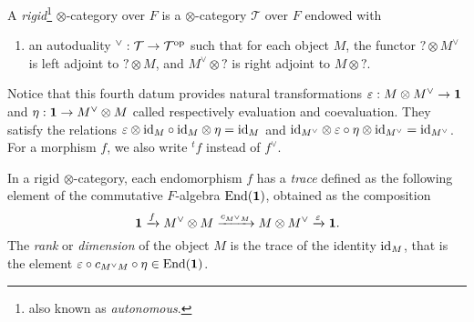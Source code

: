 \documentclass[../main.tex]{subfiles}
\begin{document}
A \emph{rigid}\footnote{also known as \emph{autonomous}.} $\otimes$-category over $F$ is a $\otimes$-category $\mathcal{T}$ over $F$ endowed with
\begin{enumerate}[resume, label=\roman*)]
    \item an autoduality $^{\vee} : \mathcal{T} \to \mathcal{T}^{\mathrm{op}}$ such that for each object $M$, the functor $? \otimes M^{\vee}$ is left adjoint to $? \otimes M$, and $M^{\vee} \otimes ?$ is right adjoint to $M \otimes ?$.
\end{enumerate}

Notice that this fourth datum provides natural transformations $\varepsilon : M \otimes M^{\vee} \to \mathbf{1}$ and $\eta : \mathbf{1} \to M^{\vee} \otimes M$ called respectively evaluation and coevaluation.
They satisfy the relations $\varepsilon \otimes \mathrm{id}_M \circ \mathrm{id}_M \otimes \eta = \mathrm{id}_M$ and $\mathrm{id}_{M^{\vee}} \otimes \varepsilon \circ \eta \otimes \mathrm{id}_{M^{\vee}} = \mathrm{id}_{M^{\vee}}$.
For a morphism $f$, we also write $^tf$ instead of $f^{\vee}$.

In a rigid $\otimes$-category, each endomorphism $f$ has a \emph{trace} defined as the following element of the commutative $F$-algebra $\operatorname{End}(\mathbf{1})$, obtained as the composition
$$\mathbf{1} \xrightarrow{f} M^{\vee} \otimes M \xrightarrow{c_{M^{\vee}M}} M \otimes M^{\vee} \xrightarrow{\varepsilon} \mathbf{1}.$$
The \emph{rank} or \emph{dimension} of the object $M$ is the trace of the identity $\mathrm{id}_M$, that is the element $\varepsilon \circ c_{M^{\vee}M} \circ \eta \in \operatorname{End}(\mathbf{1})$.
\end{document}
